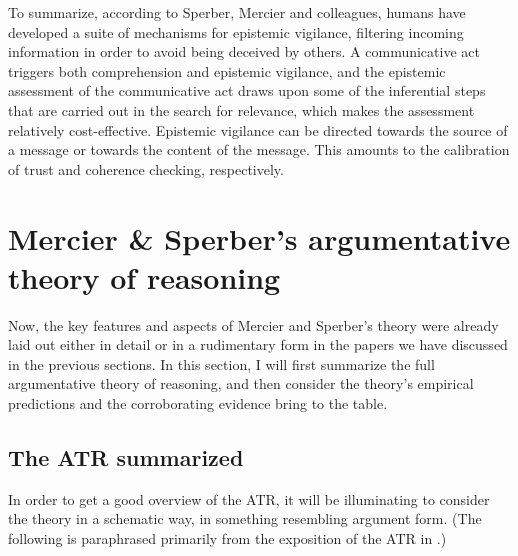 To summarize, according to Sperber, Mercier and colleagues, humans have developed a suite of mechanisms for epistemic vigilance, filtering incoming information in order to avoid being deceived by others. A communicative act triggers both comprehension and epistemic vigilance, and the epistemic assessment of the communicative act draws upon some of the inferential steps that are carried out in the search for relevance, which makes the assessment relatively cost-effective. Epistemic vigilance can be directed towards the source of a message or towards the content of the message. This amounts to the calibration of trust and coherence checking, respectively.

\section{Mercier \& Sperber's argumentative theory of reasoning}
\label{sec:MS11}

Now, the key features and aspects of Mercier and Sperber's theory were already laid out either in detail or in a rudimentary form in the papers we have discussed in the previous sections.
In this section, I will first summarize the full argumentative theory of reasoning, and then consider the theory's empirical predictions and the corroborating evidence \citet{MS11} bring to the table.

\subsection{The ATR summarized}

In order to get a good overview of the ATR, it will be illuminating to consider the theory in a schematic way, in something resembling argument form. (The following is paraphrased primarily from the exposition of the ATR in \citet[p.~60]{MS11}.)


